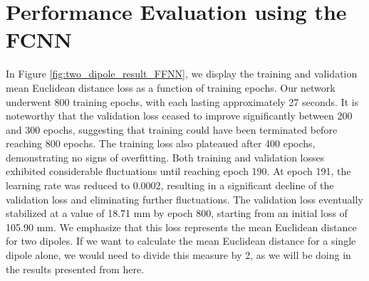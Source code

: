 \documentclass[a4paper, UKenglish, 11pt]{uiomaster}
\begin{document}
\section{Performance Evaluation using the FCNN}
In Figure \ref{fig:two_dipole_result_FFNN}, we display the training and validation mean Euclidean distance loss as a function of training epochs. Our network underwent 800 training epochs, with each lasting approximately 27 seconds. It is noteworthy that the validation loss ceased to improve significantly between 200 and 300 epochs, suggesting that training could have been terminated before reaching 800 epochs. The training loss also plateaued after 400 epochs, demonstrating no signs of overfitting. Both training and validation losses exhibited considerable fluctuations until reaching epoch 190. At epoch 191, the learning rate was reduced to 0.0002, resulting in a significant decline of the validation loss and eliminating further fluctuations. The validation loss eventually stabilized at a value of 18.71 mm by epoch 800, starting from an initial loss of 105.90 mm. We emphasize that this loss represents the mean Euclidean distance for two dipoles. If we want to calculate the mean Euclidean distance for a single dipole alone, we would need to divide this measure by 2, as we will be doing in the results presented from here.



\end{document}
